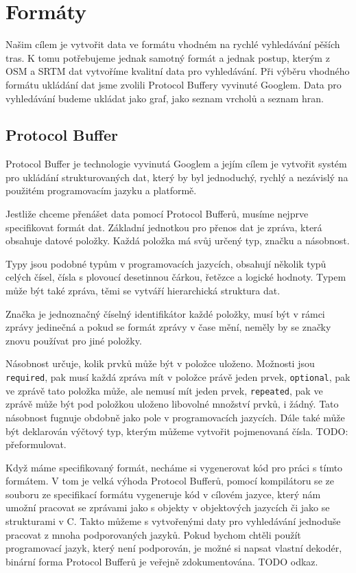 \chapter{Formáty}
Našim cílem je vytvořit data ve formátu vhodném na rychlé vyhledávání pěších
tras. K tomu potřebujeme jednak samotný formát a jednak postup, kterým z OSM a
SRTM dat vytvoříme kvalitní data pro vyhledávání. Při výběru vhodného formátu
ukládání dat jsme zvolili Protocol Buffery vyvinuté Googlem\cite{pbfweb}. Data
pro vyhledávání budeme ukládat jako graf, jako seznam vrcholů a seznam hran.

\section{Protocol Buffer}
Protocol Buffer je technologie vyvinutá Googlem a jejím cílem je vytvořit systém
pro ukládání strukturovaných dat, který by byl jednoduchý, rychlý a nezávislý na
použitém programovacím jazyku a platformě.

Jestliže chceme přenášet data pomocí Protocol Bufferů, musíme nejprve
specifikovat formát dat. Základní jednotkou pro přenos dat je zpráva, která
obsahuje datové položky. Každá položka má svůj určený typ, značku a násobnost.

{\tuc Typy} jsou podobné typům v programovacích jazycích, obsahují několik typů celých
čísel, čísla s plovoucí desetinnou čárkou, řetězce a logické hodnoty. Typem může
být také zpráva, těmi se vytváří hierarchická struktura dat. 

{\tuc Značka} je jednoznačný číselný identifikátor každé položky, musí být v rámci
zprávy jedinečná a pokud se formát zprávy v čase mění, neměly by se značky znovu
používat pro jiné položky.

{\tuc Násobnost} určuje, kolik prvků může být v položce uloženo. Možnosti jsou
\verb|required|, pak musí každá zpráva mít v položce právě jeden prvek,
\verb|optional|, pak ve zprávě tato položka může, ale nemusí mít jeden prvek,
\verb|repeated|, pak ve zprávě může být pod položkou uloženo libovolné množství
prvků, i žádný. Tato násobnost fugnuje obdobně jako pole v programovacích
jazycích. Dále také může být deklarován výčtový typ, kterým můžeme vytvořit
pojmenovaná čísla. TODO: přeformulovat.

Když máme specifikovaný formát, necháme si vygenerovat kód pro práci s tímto
formátem. V tom je velká výhoda Protocol Bufferů, pomocí kompilátoru se ze
souboru ze specifikací formátu vygeneruje kód v cílovém jazyce, který nám umožní
pracovat se zprávami jako s objekty v objektových jazycích či jako se
strukturami v C. Takto můžeme s vytvořenými daty pro vyhledávání jednoduše
pracovat z mnoha podporovaných jazyků. Pokud bychom chtěli použít programovací
jazyk, který není podporován, je možné si napsat vlastní dekodér, binární forma
Protocol Bufferů je veřejně zdokumentována. TODO odkaz.

